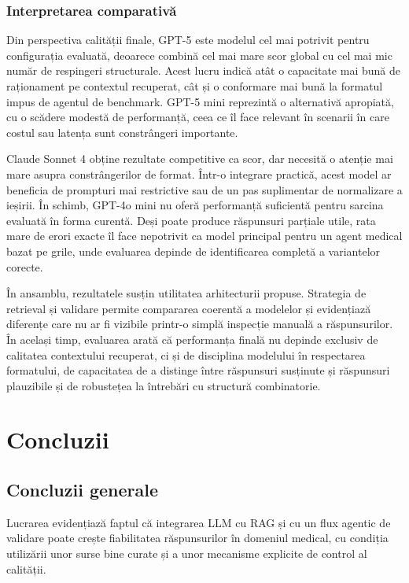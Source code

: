 \documentclass[12pt, a4paper, oneside, romanian]{teza-upb}
\begin{document}
\subsection{Interpretarea comparativă}

Din perspectiva calității finale, GPT-5 este modelul cel mai potrivit pentru configurația evaluată, deoarece combină cel mai mare scor global cu cel mai mic număr de respingeri structurale. Acest lucru indică atât o capacitate mai bună de raționament pe contextul recuperat, cât și o conformare mai bună la formatul impus de agentul de benchmark. GPT-5 mini reprezintă o alternativă apropiată, cu o scădere modestă de performanță, ceea ce îl face relevant în scenarii în care costul sau latența sunt constrângeri importante.

Claude Sonnet 4 obține rezultate competitive ca scor, dar necesită o atenție mai mare asupra constrângerilor de format. Într-o integrare practică, acest model ar beneficia de prompturi mai restrictive sau de un pas suplimentar de normalizare a ieșirii. În schimb, GPT-4o mini nu oferă performanță suficientă pentru sarcina evaluată în forma curentă. Deși poate produce răspunsuri parțiale utile, rata mare de erori exacte îl face nepotrivit ca model principal pentru un agent medical bazat pe grile, unde evaluarea depinde de identificarea completă a variantelor corecte.

În ansamblu, rezultatele susțin utilitatea arhitecturii propuse. Strategia de retrieval și validare permite compararea coerentă a modelelor și evidențiază diferențe care nu ar fi vizibile printr-o simplă inspecție manuală a răspunsurilor. În același timp, evaluarea arată că performanța finală nu depinde exclusiv de calitatea contextului recuperat, ci și de disciplina modelului în respectarea formatului, de capacitatea de a distinge între răspunsuri susținute și răspunsuri plauzibile și de robustețea la întrebări cu structură combinatorie.
\chapter{Concluzii}
\section{Concluzii generale}
Lucrarea evidențiază faptul că integrarea LLM cu RAG și cu un flux agentic de validare poate crește fiabilitatea răspunsurilor în domeniul medical, cu condiția utilizării unor surse bine curate și a unor mecanisme explicite de control al calității.
\end{document}
